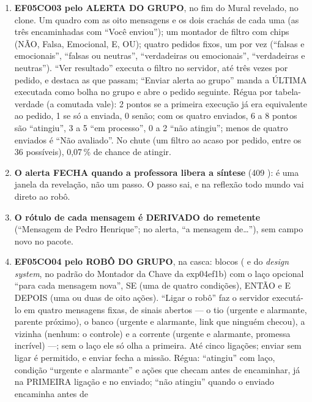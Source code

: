 \begin{enumerate}
  \item \textbf{EF05CO03 pelo ALERTA DO GRUPO}, no fim do Mural revelado, no
    clone. Um quadro com as oito mensagens e os dois crachás de cada uma (as
    três encaminhadas com \enquote{Você enviou}); um montador de filtro com
    chips (NÃO, Falsa, Emocional, E, OU); quatro pedidos fixos, um por vez
    (\enquote{falsas e emocionais}, \enquote{falsas ou neutras},
    \enquote{verdadeiras ou emocionais}, \enquote{verdadeiras e neutras}).
    \enquote{Ver resultado} executa o filtro no servidor, até três vezes por
    pedido, e destaca as que passam; \enquote{Enviar alerta ao grupo} manda a
    ÚLTIMA executada como bolha no grupo e abre o pedido seguinte. Régua por
    tabela-verdade (a comutada vale): 2 pontos se a primeira execução já era
    equivalente ao pedido, 1 se só a enviada, 0 senão; com os quatro
    enviados, 6 a 8 pontos são \enquote{atingiu}, 3 a 5 \enquote{em
    processo}, 0 a 2 \enquote{não atingiu}; menos de quatro enviados é
    \enquote{Não avaliado}. No chute (um filtro ao acaso por pedido, entre os
    36 possíveis), 0,07\,\% de chance de atingir.
  \item \textbf{O alerta FECHA quando a professora libera a síntese} (409
    ): é uma janela da revelação, não um passo. O passo
     sai, e na reflexão todo mundo vai direto ao robô.
  \item \textbf{O rótulo de cada mensagem é DERIVADO do remetente}
    (\enquote{Mensagem de Pedro Henrique}; no alerta, \enquote{a mensagem
    de\ldots}), sem campo novo no pacote.
  \item \textbf{EF05CO04 pelo ROBÔ DO GRUPO}, na casca: blocos
    ( e  do \emph{design system}, no padrão do
    Montador da Chave da exp04ef1b) com o laço opcional \enquote{para cada
    mensagem nova}, SE (uma de quatro condições), ENTÃO e E DEPOIS (uma ou
    duas de oito ações). \enquote{Ligar o robô} faz o servidor executá-lo em
    quatro mensagens fixas, de sinais abertos --- o tio (urgente e alarmante,
    parente próximo), o banco (urgente e alarmante, link que ninguém checou),
    a vizinha (nenhum: o controle) e a corrente (urgente e alarmante,
    promessa incrível) ---; sem o laço ele só olha a primeira. Até cinco
    ligações; enviar sem ligar é permitido, e enviar fecha a missão. Régua:
    \enquote{atingiu} com laço, condição \enquote{urgente e alarmante} e
    ações que checam antes de encaminhar, já na PRIMEIRA ligação e no
    enviado; \enquote{não atingiu} quando o enviado encaminha antes de

\end{enumerate}
